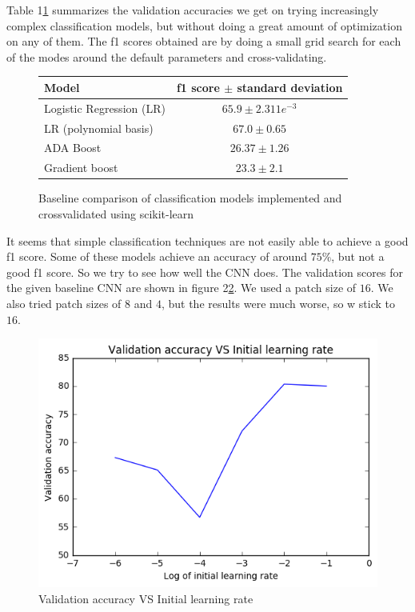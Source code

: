 \documentclass[10pt,conference,compsocconf]{IEEEtran}
\begin{document}
Table 1\ref{baseline} summarizes the validation accuracies we get on trying increasingly complex classification models, but without doing a great amount of optimization on any of them. The f1 scores obtained are by doing a small grid search for each of the modes around the default parameters and cross-validating. 
\begin{figure}[h!]\label{baseline}
\center
\begin{tabular}{ l | c  }
  Model & f1 score $\pm$ standard deviation  \\
  \hline
  Logistic Regression (LR) & $65.9 \pm 2.311e^{-3}$  \\
  LR (polynomial basis) & $67.0 \pm 0.65$  \\
  ADA Boost & $26.37 \pm 1.26$ \\
  Gradient boost & $23.3 \pm 2.1$
\end{tabular}
\caption{Baseline comparison of classification models implemented and crossvalidated using scikit-learn}
\end{figure}
It seems that simple classification techniques are not easily able to achieve a good f1 score. Some of these models achieve an accuracy of around $75\%$, but not a good f1 score. So we try to see how well the CNN does. The validation scores for the given baseline CNN are shown in figure 2\ref{lr}. We used a patch size of $16$. We also tried patch sizes of $8$ and $4$, but the results were much worse, so w stick to $16$.
\begin{figure}\label{lr}
 \center
 \includegraphics[scale=0.5]{lr.png}
 \caption{Validation accuracy VS Initial learning rate}
\end{figure}
\end{document}
